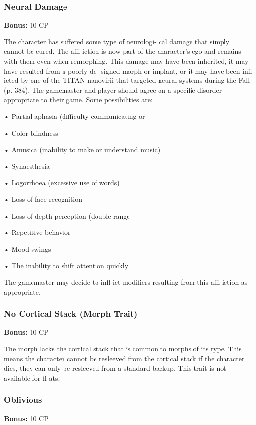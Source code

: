 \subsubsection{Neural Damage}

\textbf{Bonus:} 10 CP

The character has suffered some type of neurologi-
cal damage that simply cannot be cured. The affl iction 
is now part of the character's ego and remains with 
them even when remorphing. This damage may have 
been inherited, it may have resulted from a poorly de-
signed morph or implant, or it may have been infl icted 
by one of the TITAN nanovirii that targeted neural 
systems during the Fall (p. 384). The gamemaster and 
player should agree on a specific disorder appropriate 
to their game. Some possibilities are:

•  Partial aphasia (difficulty communicating or 

•  Color blindness

•  Amusica (inability to make or understand music)

•  Synaesthesia

•  Logorrhoea (excessive use of words)

•  Loss of face recognition

•  Loss of depth perception (double range 

•  Repetitive behavior

•  Mood swings

•  The inability to shift attention quickly

The gamemaster may decide to infl ict  modifiers 
resulting from this affl iction as appropriate.

\subsubsection{No Cortical Stack (Morph Trait)}

\textbf{Bonus:} 10 CP

The morph lacks the cortical stack that is common 
to morphs of its type. This means the character cannot 
be resleeved from the cortical stack if the character 
dies, they can only be resleeved from a standard 
backup. This trait is not available for fl ats.

\subsubsection{Oblivious}

\textbf{Bonus:} 10 CP

